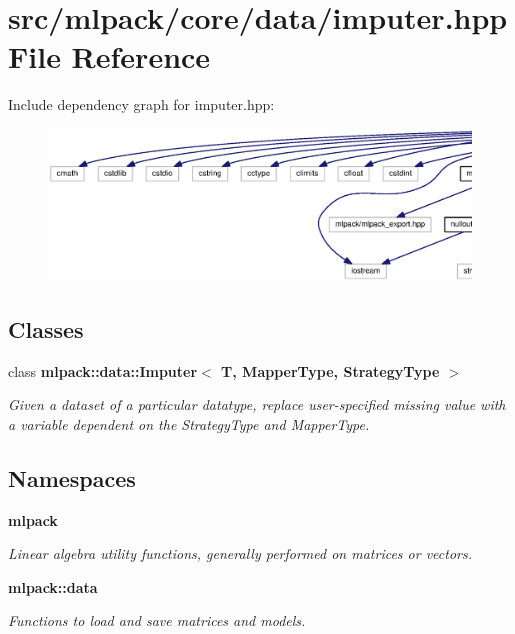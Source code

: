 \section{src/mlpack/core/data/imputer.hpp File Reference}
\label{imputer_8hpp}
Include dependency graph for imputer.\+hpp\+:
\nopagebreak
\begin{figure}[H]
\begin{center}
\leavevmode
\includegraphics[width=350pt]{imputer_8hpp__incl}
\end{center}
\end{figure}
\subsection*{Classes}
\begin{DoxyCompactItemize}
\item 
class {\bf mlpack\+::data\+::\+Imputer$<$ T, Mapper\+Type, Strategy\+Type $>$}
\begin{DoxyCompactList}\small\item\em Given a dataset of a particular datatype, replace user-\/specified missing value with a variable dependent on the Strategy\+Type and Mapper\+Type. \end{DoxyCompactList}\end{DoxyCompactItemize}
\subsection*{Namespaces}
\begin{DoxyCompactItemize}
\item 
 {\bf mlpack}
\begin{DoxyCompactList}\small\item\em Linear algebra utility functions, generally performed on matrices or vectors. \end{DoxyCompactList}\item 
 {\bf mlpack\+::data}
\begin{DoxyCompactList}\small\item\em Functions to load and save matrices and models. \end{DoxyCompactList}\end{DoxyCompactItemize}


